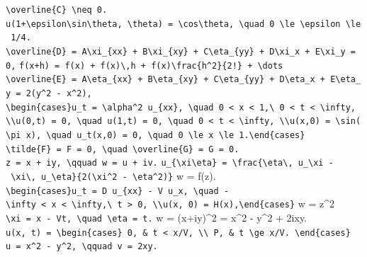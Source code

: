 \documentclass[
  ukrainian,
]{article}
\begin{document}
\texttt{\textbackslash{}overline\{C\}\ \textbackslash{}neq\ 0.}
\texttt{u(1+\textbackslash{}epsilon\textbackslash{}sin\textbackslash{}theta,\ \textbackslash{}theta)\ =\ \textbackslash{}cos\textbackslash{}theta,\ \textbackslash{}quad\ 0\ \textbackslash{}le\ \textbackslash{}epsilon\ \textbackslash{}le\ 1/4.}
\texttt{\textbackslash{}overline\{D\}\ =\ A\textbackslash{}xi\_\{xx\}\ +\ B\textbackslash{}xi\_\{xy\}\ +\ C\textbackslash{}eta\_\{yy\}\ +\ D\textbackslash{}xi\_x\ +\ E\textbackslash{}xi\_y\ =\ 0,}
\texttt{f(x+h)\ =\ f(x)\ +\ f\textquotesingle{}(x)\textbackslash{},h\ +\ f\textquotesingle{}\textquotesingle{}(x)\textbackslash{}frac\{h\^{}2\}\{2!\}\ +\ \textbackslash{}dots}
\texttt{\textbackslash{}overline\{E\}\ =\ A\textbackslash{}eta\_\{xx\}\ +\ B\textbackslash{}eta\_\{xy\}\ +\ C\textbackslash{}eta\_\{yy\}\ +\ D\textbackslash{}eta\_x\ +\ E\textbackslash{}eta\_y\ =\ 2(y\^{}2\ -\ x\^{}2),}
\texttt{\textbackslash{}begin\{cases\}u\_t\ =\ \textbackslash{}alpha\^{}2\ u\_\{xx\},\ \textbackslash{}quad\ 0\ \textless{}\ x\ \textless{}\ 1,\textbackslash{}\ 0\ \textless{}\ t\ \textless{}\ \textbackslash{}infty,\ \textbackslash{}\textbackslash{}u(0,t)\ =\ 0,\ \textbackslash{}quad\ u(1,t)\ =\ 0,\ \textbackslash{}quad\ 0\ \textless{}\ t\ \textless{}\ \textbackslash{}infty,\ \textbackslash{}\textbackslash{}u(x,0)\ =\ \textbackslash{}sin(\textbackslash{}pi\ x),\ \textbackslash{}quad\ u\_t(x,0)\ =\ 0,\ \textbackslash{}quad\ 0\ \textbackslash{}le\ x\ \textbackslash{}le\ 1.\textbackslash{}end\{cases\}}
\texttt{\textbackslash{}tilde\{F\}\ =\ F\ =\ 0,\ \textbackslash{}quad\ \textbackslash{}overline\{G\}\ =\ G\ =\ 0.}
\texttt{z\ =\ x\ +\ iy,\ \textbackslash{}qquad\ w\ =\ u\ +\ iv.}
\texttt{u\_\{\textbackslash{}xi\textbackslash{}eta\}\ =\ \textbackslash{}frac\{\textbackslash{}eta\textbackslash{},\ u\_\textbackslash{}xi\ -\ \textbackslash{}xi\textbackslash{},\ u\_\textbackslash{}eta\}\{2(\textbackslash{}xi\^{}2\ -\ \textbackslash{}eta\^{}2)\}}
w = f(z).
\texttt{\textbackslash{}begin\{cases\}u\_t\ =\ D\ u\_\{xx\}\ -\ V\ u\_x,\ \textbackslash{}quad\ -\textbackslash{}infty\ \textless{}\ x\ \textless{}\ \textbackslash{}infty,\textbackslash{}\ t\ \textgreater{}\ 0,\ \textbackslash{}\textbackslash{}u(x,\ 0)\ =\ H(x),\textbackslash{}end\{cases\}}
w = z\^{}2
\texttt{\textbackslash{}xi\ =\ x\ -\ Vt,\ \textbackslash{}quad\ \textbackslash{}eta\ =\ t.}
w = (x+iy)\^{}2 = x\^{}2 - y\^{}2 + 2ixy.
\texttt{u(x,\ t)\ =\ \textbackslash{}begin\{cases\}\ 0,\ \&\ t\ \textless{}\ x/V,\ \textbackslash{}\textbackslash{}\ P,\ \&\ t\ \textbackslash{}ge\ x/V.\ \textbackslash{}end\{cases\}}
\texttt{u\ =\ x\^{}2\ -\ y\^{}2,\ \textbackslash{}qquad\ v\ =\ 2xy.}
\end{document}

